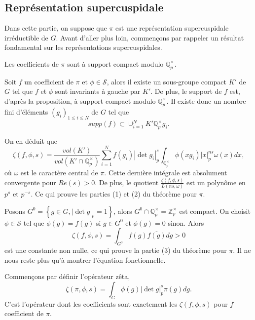 \subsection{Représentation supercuspidale}

Dans cette partie, on suppose que $\pi$ est une représentation supercuspidale irréductible de $G$. Avant d'aller plus loin, commençons par rappeler un résultat fondamental sur les représentations supercuspidales.

\begin{proposition}
Les coefficients de $\pi$ sont à support compact modulo $\mathbb{Q}_p^\times$.
\end{proposition}

Soit $f$ un coefficient de $\pi$ et $\phi \in \mathcal{S}$, alors il existe un sous-groupe compact $K'$ de $G$ tel que $f$ et $\phi$ sont invariants à gauche par $K'$. De plus, le support de $f$ est, d'après la proposition, à support compact modulo $\mathbb{Q}_p^\times$. Il existe donc un nombre fini d'éléments $(g_i)_{1 \leq i \leq N}$ de $G$ tel que
\begin{equation}
supp(f) \subset \cup_{i=1}^N K'\mathbb{Q}_p^\times g_i.
\end{equation}

On en déduit que
\begin{equation}
\zeta(f,\phi,s) = \frac{vol(K')}{vol(K' \cap \mathbb{Q}_p^\times)} \sum_{i=1}^N f(g_i)|\det g_i|_p^s \int_{\mathbb{Q}_p^\times} \phi(xg_i)|x|_p^{ns}\omega(x)dx,
\end{equation}
où $\omega$ est le caractère central de $\pi$. Cette dernière intégrale est absolument convergente pour $Re(s) > 0$. De plus, le quotient $\frac{\zeta(f,\phi,s)}{L(ns,\omega)}$ est un polynôme en $p^s$ et $p^{-s}$. Ce qui prouve les parties (1) et (2) du théorème pour $\pi$.

Posons $G^0=\left\lbrace g \in G, |\det g|_p = 1 \right\rbrace$, alors $G^0 \cap \mathbb{Q}_p^\times = \mathbb{Z}_p^\times$ est compact. On choisit $\phi \in \mathcal{S}$ tel que $\phi(g) = \overline{f(g)}$ si $g \in G^0$ et $\phi(g)=0$ sinon. Alors
\begin{equation}
\zeta(f, \phi, s) = \int_{G^0} f(g)\overline{f(g)} dg > 0
\end{equation}
est une constante non nulle, ce qui prouve la partie (3) du théorème pour $\pi$. Il ne nous reste plus qu'à montrer l'équation fonctionnelle.

Commençons par définir l'opérateur zêta,
\begin{equation}
\zeta(\pi, \phi, s) = \int_G \phi(g)|\det g|_p^s\pi(g) dg.
\end{equation}
C'est l'opérateur dont les coefficients sont exactement les $\zeta(f, \phi,s)$ pour $f$ coefficient de $\pi$.

